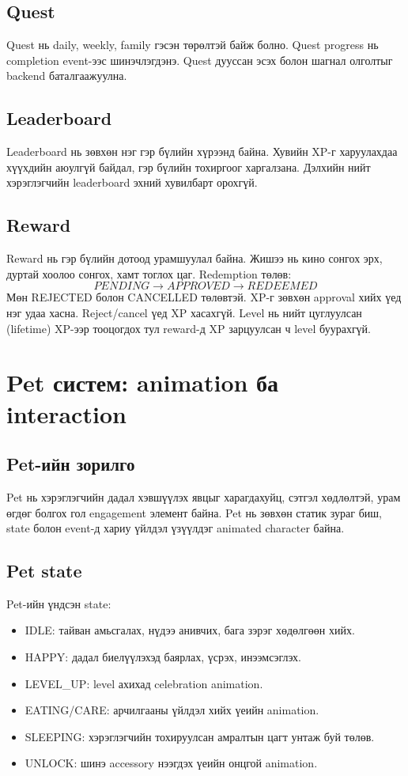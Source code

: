 \documentclass[12pt,a4paper,oneside]{report}
\begin{document}
\section{Quest}
Quest нь daily, weekly, family гэсэн төрөлтэй байж болно. Quest progress нь completion event-ээс шинэчлэгдэнэ. Quest дууссан эсэх болон шагнал олголтыг backend баталгаажуулна.

\section{Leaderboard}
Leaderboard нь зөвхөн нэг гэр бүлийн хүрээнд байна. Хувийн XP-г харуулахдаа хүүхдийн аюулгүй байдал, гэр бүлийн тохиргоог харгалзана. Дэлхийн нийт хэрэглэгчийн leaderboard эхний хувилбарт орохгүй.

\section{Reward}
Reward нь гэр бүлийн дотоод урамшуулал байна. Жишээ нь кино сонгох эрх, дуртай хоолоо сонгох, хамт тоглох цаг. Redemption төлөв:
\[
PENDING \rightarrow APPROVED \rightarrow REDEEMED
\]
Мөн REJECTED болон CANCELLED төлөвтэй. XP-г зөвхөн approval хийх үед нэг удаа хасна. Reject/cancel үед XP хасахгүй. Level нь нийт цуглуулсан (lifetime) XP-ээр тооцогдох тул reward-д XP зарцуулсан ч level буурахгүй.

\chapter{Pet систем: animation ба interaction}

\section{Pet-ийн зорилго}
Pet нь хэрэглэгчийн дадал хэвшүүлэх явцыг харагдахуйц, сэтгэл хөдлөлтэй, урам өгдөг болгох гол engagement элемент байна. Pet нь зөвхөн статик зураг биш, state болон event-д хариу үйлдэл үзүүлдэг animated character байна.

\section{Pet state}
Pet-ийн үндсэн state:
\begin{itemize}
  \item IDLE: тайван амьсгалах, нүдээ анивчих, бага зэрэг хөдөлгөөн хийх.
  \item HAPPY: дадал биелүүлэхэд баярлах, үсрэх, инээмсэглэх.
  \item LEVEL\_UP: level ахихад celebration animation.
  \item EATING/CARE: арчилгааны үйлдэл хийх үеийн animation.
  \item SLEEPING: хэрэглэгчийн тохируулсан амралтын цагт унтаж буй төлөв.
  \item UNLOCK: шинэ accessory нээгдэх үеийн онцгой animation.
\end{itemize}
\end{document}
